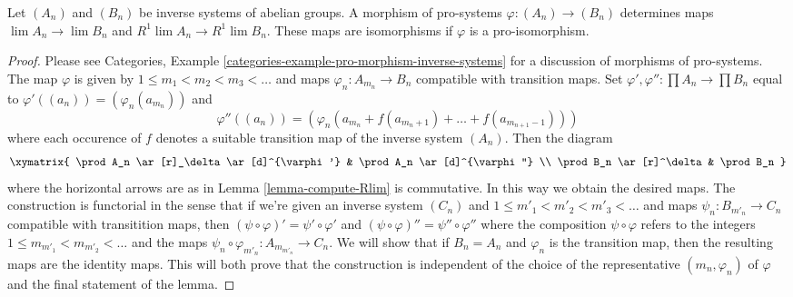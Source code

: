 \begin{lemma}
\label{lemma-pro-isomorphism-iso-Rlim}
Let $(A_n)$ and $(B_n)$ be inverse systems of abelian groups.
A morphism of pro-systems $\varphi : (A_n) \to (B_n)$ determines
maps $\lim A_n \to \lim B_n$ and $R^1\lim A_n \to R^1\lim B_n$.
These maps are isomorphisms if $\varphi$ is a pro-isomorphism.
\end{lemma}

\begin{proof}
Please see
Categories, Example \ref{categories-example-pro-morphism-inverse-systems}
for a discussion of morphisms of pro-systems.
The map $\varphi$ is given by $1 \leq m_1 < m_2 < m_3 < \ldots$
and maps $\varphi_n : A_{m_n} \to B_n$ compatible with transition
maps. Set $\varphi', \varphi'' : \prod A_n \to \prod B_n$
equal to
$\varphi'((a_n)) = (\varphi_n(a_{m_n}))$ and
$$
\varphi''((a_n)) =
(\varphi_n(a_{m_n} + f(a_{m_n + 1}) + \ldots + f(a_{m_{n + 1} - 1})))
$$
where each occurence of $f$ denotes a suitable transition map of
the inverse system $(A_n)$. Then the diagram
$$
\xymatrix{
\prod A_n \ar[r]_\delta \ar[d]^{\varphi'} &
\prod A_n \ar[d]^{\varphi''} \\
\prod B_n \ar[r]^\delta & \prod B_n
}
$$
where the horizontal arrows are as in Lemma \ref{lemma-compute-Rlim}
is commutative. In this way we obtain the desired maps. The construction
is functorial in the sense that if we're given an inverse system $(C_n)$
and $1 \leq m'_1 < m'_2 < m'_3 < \ldots$ and maps $\psi_n : B_{m'_n} \to C_n$
compatible with transitition maps, then
$(\psi \circ \varphi)' = \psi' \circ \varphi'$ and
$(\psi \circ \varphi)'' = \psi'' \circ \varphi''$
where the composition $\psi \circ \varphi$ refers to the integers
$1 \leq m_{m'_1} < m_{m'_2} < \ldots$ and the maps
$\psi_n \circ \varphi_{m'_n} : A_{m_{m'_n}} \to C_n$. We will show
that if $B_n = A_n$ and $\varphi_n$ is the transition map, then
the resulting maps are the identity maps. This will both prove that
the construction is independent of the choice of the representative
$(m_n, \varphi_n)$ of $\varphi$ and the final statement of the lemma.


\end{proof}
